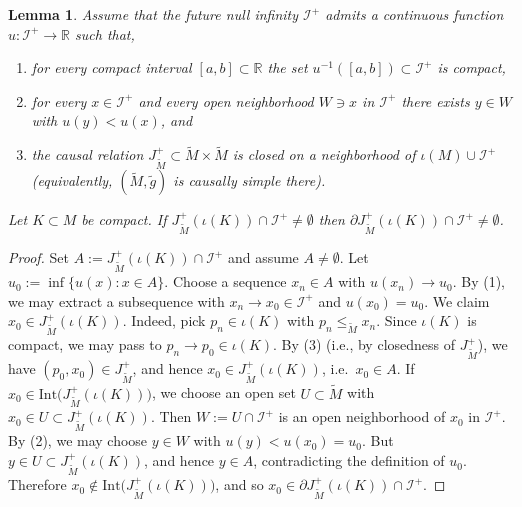 \documentclass[a4paper, reqno]{amsart}
\numberwithin{equation}{section}
\theoremstyle{plain}
\newtheorem{lemma}[theorem]{Lemma}
\theoremstyle{definition}
\theoremstyle{remark}
\newcommand{\R}{\mathbb{R}}
\begin{document}
\begin{lemma}\label{lem:weak_to_prompt}
Assume that the future null infinity $\mathscr I^+$ admits a continuous function
$u:\mathscr I^+\to\R$ such that,
\begin{enumerate}
\item for every compact interval $[a,b]\subset\R$ the set
$u^{-1}([a,b])\subset\mathscr I^+$ is compact,
\item  for every $x\in\mathscr I^+$ and every open neighborhood
$W\ni x$ in $\mathscr I^+$ there exists $y\in W$ with $u(y)<u(x)$, and
\item the causal relation
$J^+_{\tilde M}\subset\tilde M\times\tilde M$ is closed on a neighborhood of
$\iota(M)\cup\mathscr I^+$ (equivalently, $(\tilde M,\tilde g)$ is causally simple there).
\end{enumerate}
Let $K\subset M$ be compact. If $J^+_{\tilde M}(\iota(K))\cap\mathscr I^+\neq \emptyset$ then $\partial J^+_{\tilde M}(\iota(K))\cap\mathscr I^+\neq\emptyset$.
\end{lemma}
\begin{proof}
Set $A:=J^+_{\tilde M}(\iota(K))\cap\mathscr I^+$ and assume $A\neq\emptyset$. Let $u_0:=\inf\{u(x):x\in A\}.$
Choose a sequence $x_n\in A$ with $u(x_n)\to u_0$. By (1), we may extract a subsequence with $x_n\to x_0\in\mathscr I^+$ and $u(x_0)=u_0$. We claim $x_0\in J^+_{\tilde M}(\iota(K))$. Indeed, pick $p_n\in \iota(K)$ with $p_n\le_{\tilde M} x_n$.
Since $\iota(K)$ is compact, we may pass to $p_n\to p_0\in\iota(K)$. By (3) (i.e., by closedness of $J^+_{\tilde M}$), we have
$(p_0,x_0)\in J^+_{\tilde M}$, and hence $x_0\in J^+_{\tilde M}(\iota(K))$, i.e.\ $x_0\in A$. If $x_0\in\mathrm{Int}\big(J^+_{\tilde M}(\iota(K))\big)$, we choose an open set $U\subset\tilde M$ with
$x_0\in U\subset J^+_{\tilde M}(\iota(K))$. Then $W:=U\cap\mathscr I^+$ is an open neighborhood of $x_0$ in $\mathscr I^+$.
By (2), we may choose $y\in W$ with $u(y)<u(x_0)=u_0$. But $y\in U\subset J^+_{\tilde M}(\iota(K))$, and hence $y\in A$,
contradicting the definition of $u_0$. Therefore $x_0\notin\mathrm{Int}\big(J^+_{\tilde M}(\iota(K))\big)$, and so
$x_0\in\partial J^+_{\tilde M}(\iota(K))\cap\mathscr I^+$.

\end{proof}
\end{document}
